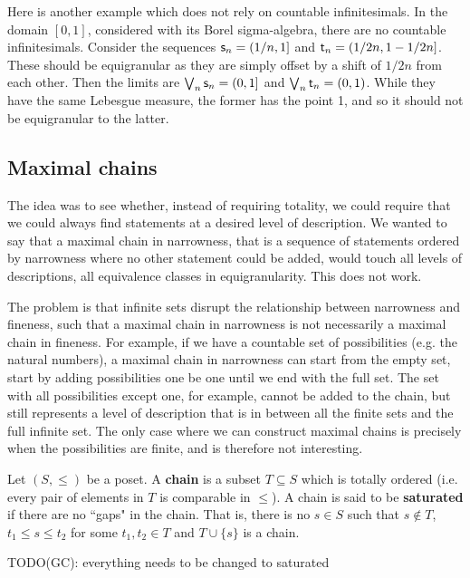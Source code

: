 \documentclass[10pt, onecolumn, longbibliography, nofootinbib]{revtex4-2}
\begin{document}
Here is another example which does not rely on countable infinitesimals. In the domain $[0,1]$, considered with its Borel sigma-algebra, there are no countable infinitesimals. Consider the sequences $\stmt_n = (1/n,1]$ and $\stmt[t]_n = (1/2n, 1 - 1/2n]$. These should be equigranular as they are simply offset by a shift of $1/2n$ from each other. Then the limits are $\bigOR_n\stmt_n = (0,1]$ and $\bigOR_n\stmt[t]_n = (0,1)$. While they have the same Lebesgue measure, the former has the point 1, and so it should not be equigranular to the latter.


\subsection{Maximal chains}

The idea was to see whether, instead of requiring totality, we could require that we could always find statements at a desired level of description. We wanted to say that a maximal chain in narrowness, that is a sequence of statements ordered by narrowness where no other statement could be added, would touch all levels of descriptions, all equivalence classes in equigranularity. This does not work.

The problem is that infinite sets disrupt the relationship between narrowness and fineness, such that a maximal chain in narrowness is not necessarily a maximal chain in fineness. For example, if we have a countable set of possibilities (e.g. the natural numbers), a maximal chain in narrowness can start from the empty set, start by adding possibilities one be one until we end with the full set. The set with all possibilities except one, for example, cannot be added to the chain, but still represents a level of description that is in between all the finite sets and the full infinite set. The only case where we can construct maximal chains is precisely when the possibilities are finite, and is therefore not interesting.

\begin{defn}
Let $(S,\leq)$ be a poset. A \textbf{chain} is a subset $T\subseteq S$ which is totally ordered (i.e. every pair of elements in $T$ is comparable in $\leq$). A chain is said to be \textbf{saturated} if there are no ``gaps" in the chain. That is, there is no $s \in S$ such that $s \notin T$, $t_1 \leq s \leq t_2$ for some $t_1, t_2 \in T$ and $T \cup \{s\}$ is a chain. 
\end{defn}

TODO(GC): everything needs to be changed to saturated
\end{document}
